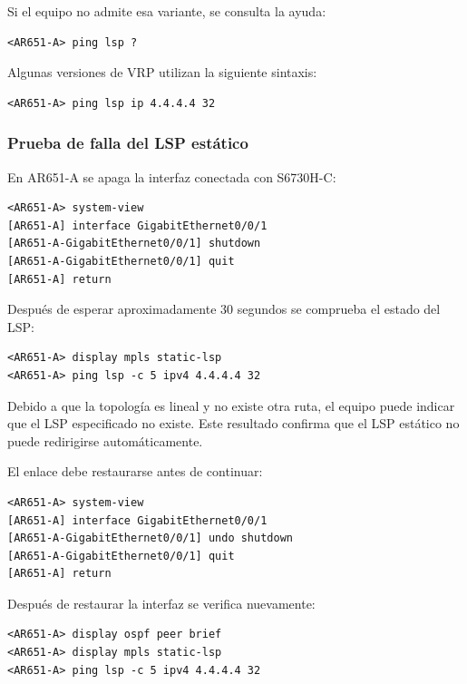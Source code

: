 Si el equipo no admite esa variante, se consulta la ayuda:

\begin{lstlisting}[style=terminal]
<AR651-A> ping lsp ?
\end{lstlisting}

Algunas versiones de VRP utilizan la siguiente sintaxis:

\begin{lstlisting}[style=terminal]
<AR651-A> ping lsp ip 4.4.4.4 32
\end{lstlisting}

\subsubsection{Prueba de falla del LSP estático}

En AR651-A se apaga la interfaz conectada con S6730H-C:

\begin{lstlisting}[style=terminal]
<AR651-A> system-view
[AR651-A] interface GigabitEthernet0/0/1
[AR651-A-GigabitEthernet0/0/1] shutdown
[AR651-A-GigabitEthernet0/0/1] quit
[AR651-A] return
\end{lstlisting}

Después de esperar aproximadamente 30 segundos se comprueba el estado del
LSP:

\begin{lstlisting}[style=terminal]
<AR651-A> display mpls static-lsp
<AR651-A> ping lsp -c 5 ipv4 4.4.4.4 32
\end{lstlisting}

Debido a que la topología es lineal y no existe otra ruta, el equipo puede
indicar que el LSP especificado no existe. Este resultado confirma que el LSP
estático no puede redirigirse automáticamente.

El enlace debe restaurarse antes de continuar:

\begin{lstlisting}[style=terminal]
<AR651-A> system-view
[AR651-A] interface GigabitEthernet0/0/1
[AR651-A-GigabitEthernet0/0/1] undo shutdown
[AR651-A-GigabitEthernet0/0/1] quit
[AR651-A] return
\end{lstlisting}

Después de restaurar la interfaz se verifica nuevamente:

\begin{lstlisting}[style=terminal]
<AR651-A> display ospf peer brief
<AR651-A> display mpls static-lsp
<AR651-A> ping lsp -c 5 ipv4 4.4.4.4 32
\end{lstlisting}

